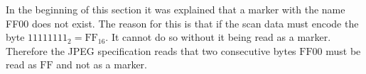 \begin{infobox}
In the beginning of this section it was explained that a marker with the name FF00 does not exist.
The reason for this is that if the scan data must encode the byte $1111 1111_2=\text{FF}_{16}$. 
It cannot do so without it being read as a marker.
Therefore the JPEG specification reads that two consecutive bytes $\text{FF}00$ must be read as $\text{FF}$ and not as a marker. 

\end{infobox}